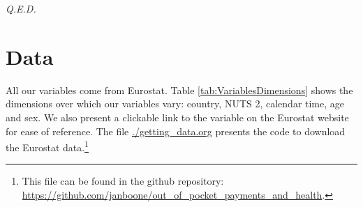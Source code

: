\documentclass[a4paper,12pt]{article}
\newcommand{\qed}{\hspace*{\fill} {\em Q.E.D.}}
\begin{document}
 \qed







\section{Data}
\label{sec:org3f40fe2}

All our variables come from Eurostat. Table \ref{tab:VariablesDimensions} shows the dimensions over which our variables vary: country, NUTS 2, calendar time, age and sex. We also present a clickable link to the variable on the Eurostat website for ease of reference. The file \url{./getting\_data.org} presents the code to download the Eurostat data.\footnote{This file can be found in the github repository: \url{https://github.com/janboone/out\_of\_pocket\_payments\_and\_health}.}
\end{document}
